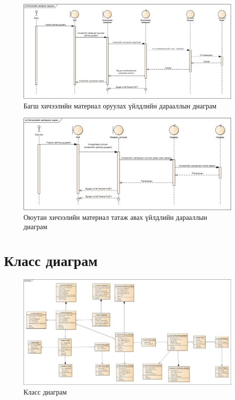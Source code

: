 \newpage
\begin{figure}
	\centering
	\includegraphics[angle=90, scale=0.5]{Diagrams/Sequence2}
	\caption[Багш хичээлийн материал оруулах үйлдлийн дарааллын диаграм]{Багш хичээлийн материал оруулах үйлдлийн дарааллын диаграм}
	\label{text}
\end{figure}

\newpage
\begin{figure}
	\centering
	\includegraphics[angle=90, scale=0.5]{Diagrams/Sequence3}
	\caption[Оюутан хичээлийн материал татаж авах үйлдлийн дарааллын диаграм]{Оюутан хичээлийн материал татаж авах үйлдлийн дарааллын диаграм}
	\label{text}
\end{figure}

\newpage
\section{Класс диаграм}
\begin{figure}
	\centering
	\includegraphics[angle=90, scale=0.4]{Diagrams/SClass}
	\caption[Класс диаграм]{Класс диаграм}
	\label{text}
\end{figure}


